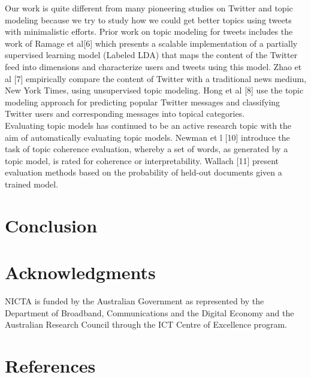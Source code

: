 \documentclass[10pt,a5paper,twoside]{article}
\begin{document}
Our work is quite different from many pioneering studies on Twitter and topic modeling because we try to study how we could get better topics using tweets with minimalistic efforts. Prior work on topic modeling for tweets includes the work of Ramage et al[6] which presents a scalable implementation of a partially supervised learning model (Labeled LDA) that maps the content of the Twitter feed into dimensions and characterize users and tweets using this model. Zhao et al [7] empirically compare the content of Twitter with a traditional news medium, New York Times, using unsupervised topic modeling. Hong et al [8] use the topic modeling approach for predicting popular Twitter messages and classifying Twitter users and corresponding messages into topical categories.
\\
Evaluating topic models has continued to be an active research topic with the aim of automatically evaluating topic models. Newman et l [10] introduce the task of topic coherence evaluation, whereby a set of words, as generated by a topic model, is rated for coherence or interpretability. Wallach [11] present evaluation methods based on the probability of held-out documents given a trained model.


\section{Conclusion}

\section*{Acknowledgments}
NICTA is funded by the Australian Government as represented by the Department of Broadband,
Communications and the Digital Economy and the Australian Research Council through the ICT
Centre of Excellence program.

\section*{References}
%



%




\end{document}
